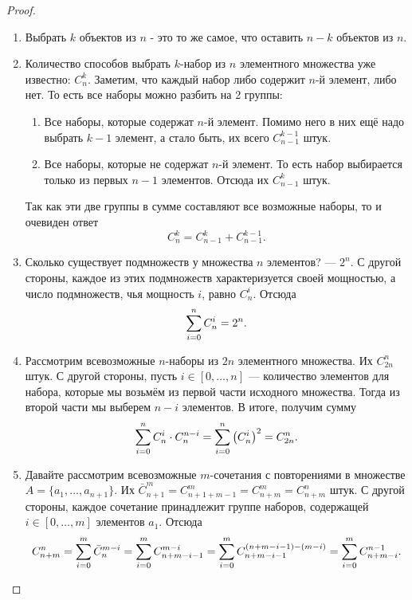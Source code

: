 \begin{proof}~
	\begin{enumerate}
		\item Выбрать $k$ объектов из $n$ - это то же самое, что оставить $n - k$ объектов из $n$.
		
		\item Количество способов выбрать $k$-набор из $n$ элементного множества уже известно: $C_n^k$. Заметим, что каждый набор либо содержит $n$-й элемент, либо нет. То есть все наборы можно разбить на 2 группы:
		\begin{enumerate}
			\item Все наборы, которые содержат $n$-й элемент. Помимо него в них ещё надо выбрать $k - 1$ элемент, а стало быть, их всего $C_{n - 1}^{k - 1}$ штук.
			
			\item Все наборы, которые не содержат $n$-й элемент. То есть набор выбирается только из первых $n - 1$ элементов. Отсюда их $C_{n - 1}^k$ штук.
		\end{enumerate}
		Так как эти две группы в сумме составляют все возможные наборы, то и очевиден ответ
		\[
			C_n^k = C_{n - 1}^k + C_{n - 1}^{k - 1}.
		\]
		
		\item Сколько существует подмножеств у множества $n$ элементов? --- $2^n$. С другой стороны, каждое из этих подмножеств характеризуется своей мощностью, а число подмножеств, чья мощность $i$, равно $C_n^i$. Отсюда
		\[
			\sum\limits_{i = 0}^n C_n^i = 2^n.
		\]
		
		\item Рассмотрим всевозможные $n$-наборы из $2n$ элементного множества. Их $C_{2n}^n$ штук. С другой стороны, пусть $i \in [0, \ldots, n]$ --- количество элементов для набора, которые мы возьмём из первой части исходного множества. Тогда из второй части мы выберем $n - i$ элементов. В итоге, получим сумму
		\[
			\sum\limits_{i = 0}^n C_n^i \cdot C_n^{n - i} = \sum\limits_{i = 0}^n \left(C_n^i\right)^2 = C_{2n}^n.
		\]
		
		\item Давайте рассмотрим всевозможные $m$-сочетания с повторениями в множестве $A = \{a_1, \ldots, a_{n + 1}\}$. Их $\bar{C}_{n + 1}^m = C_{n + 1 + m - 1}^m = C_{n + m}^m = C_{n + m}^n$ штук. С другой стороны, каждое сочетание принадлежит группе наборов, содержащей $i \in [0, \ldots, m]$ элементов $a_1$. Отсюда
		\[
			C_{n + m}^n = \sum\limits_{i = 0}^m \bar{C}_n^{m - i} = \sum\limits_{i = 0}^m C_{n + m - i - 1}^{m - i} = \sum\limits_{i = 0}^m C_{n + m - i - 1}^{(n + m - i - 1) - (m - i)} = \sum\limits_{i = 0}^m C_{n + m - i}^{n - 1}.
		\]
	\end{enumerate}
\end{proof}